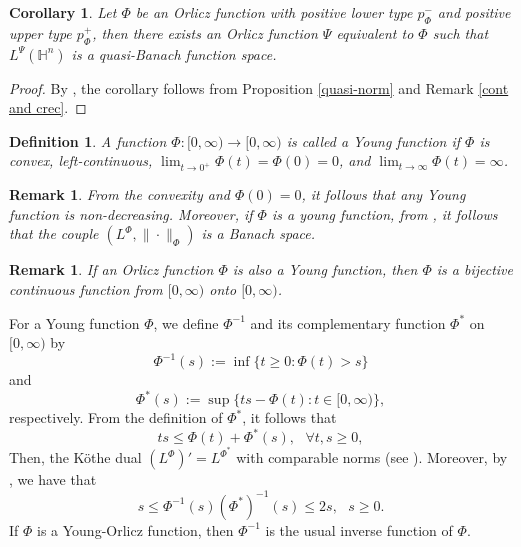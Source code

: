 \documentclass[oneside,10pt]{article}
\newtheorem{corollary}[theorem]{Corollary}
\newtheorem{definition}[theorem]{Definition}
\newtheorem{remark}[theorem]{Remark}
\begin{document}
\begin{corollary}
Let $\Phi$ be an Orlicz function with positive lower type $p_{\Phi}^{-}$ and positive upper type $p_{\Phi}^{+}$, then there exists an Orlicz function $\Psi$ equivalent to $\Phi$ such that $L^{\Psi}(\mathbb{H}^n)$ is a quasi-Banach function space.
\end{corollary}

\begin{proof}
By \cite[Definitions 2.8 and 2.9]{Nekvinda}, the corollary follows from Proposition \ref{quasi-norm} and Remark \ref{cont and crec}.
\end{proof}

\begin{definition}
A function $\Phi : [0, \infty) \to [0, \infty)$ is called a \textit{Young function} if $\Phi$ is convex, left-continuous, $\lim_{t \to 0^{+}} \Phi(t) = \Phi(0) = 0$, and $\lim_{t \to \infty} \Phi(t) = \infty$.
\end{definition}

\begin{remark}
From the convexity and $\Phi(0) = 0$, it follows that any Young function is non-decreasing. Moreover, if $\Phi$ is a young function, from \cite[Lemma 3.2.2 (b) and Theorem 3.3.7 (b)]{Hasto}, it follows that the couple 
$(L^{\Phi}, \| \cdot \|_{\Phi})$ is a Banach space.
\end{remark}

\begin{remark} \label{Orlicz cont}
If an Orlicz function $\Phi$ is also a Young function, then $\Phi$ is a bijective continuous function from $[0, \infty)$ onto $[0, \infty)$.
\end{remark}


For a Young function $\Phi$, we define $\Phi^{-1}$ and its complementary function $\Phi^{*}$ on $[0, \infty)$ by
\[
\Phi^{-1}(s):= \inf\{ t \geq 0 : \Phi(t) > s \}
\]
and
\[
\Phi^{*}(s) := \sup\{ ts - \Phi(t) : t \in [0, \infty) \},
\]
respectively. From the definition of $\Phi^{*}$, it follows that
\begin{equation} \label{Young ineq}
ts \leq \Phi(t) + \Phi^{*}(s), \,\,\,\, \forall t,s \geq 0,
\end{equation}
Then, the K\"othe dual $(L^{\Phi})' = L^{\Phi^{*}}$ with comparable norms (see \cite[Lemma 2.4.2 and Theorem 3.4.6]{Hasto}). Moreover, 
by \cite[Property 1.6]{ONeil}, we have that
\begin{equation} \label{prop 1.6}
s \leq \Phi^{-1}(s) (\Phi^{*})^{-1}(s) \leq 2s, \,\,\,\, s \geq 0.
\end{equation}
If $\Phi$ is a Young-Orlicz function, then $\Phi^{-1}$ is the usual inverse function of $\Phi$.
\end{document}
